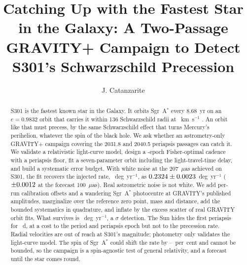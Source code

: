 \documentclass{aastex701}
\begin{document}
\title{Catching Up with the Fastest Star in the Galaxy: A Two-Passage GRAVITY+ Campaign to Detect S301's Schwarzschild Precession}

\author{J. Catanzarite}


\begin{abstract}
S301 is the fastest known star in the Galaxy. It orbits Sgr~A$^*$ every 8.68~yr on an $e = 0.9832$ orbit that carries it within 136 Schwarzschild radii at \lightcurveVpKms{}~km~s$^{-1}$ \citep{gravity2026}. An orbit like that must precess, by the same Schwarzschild effect that turns Mercury's perihelion, whatever the spin of the black hole. We ask whether an astrometry-only GRAVITY+ campaign covering the 2031.8 and 2040.5 periapsis passages can catch it. We validate a relativistic light-curve model, design a \campaignNEpochs{}-epoch Fisher-optimal cadence with a periapsis floor, fit a seven-parameter orbit including the light-travel-time delay, and build a systematic error budget. With white noise at the 207~$\mu$as achieved on S301, the fit recovers the injected rate, \fitTruthOmegaDotDegYr{}~deg~yr$^{-1}$, as $0.2324 \pm 0.0023$~deg~yr$^{-1}$ ($\pm0.0012$ at the forecast 100~$\mu$as). Real astrometric noise is not white. We add per-run calibration offsets and a wandering Sgr~A$^*$ photocentre at GRAVITY's published amplitudes, marginalize over the reference zero point, mass and distance, add the bounded systematics in quadrature, and inflate by the excess scatter of real GRAVITY orbit fits. What survives is \budgetBottomLineInflated{}~deg~yr$^{-1}$, a \budgetBottomLineInflatedDetectionNsigma{}$\sigma$ detection. The Sun hides the first periapsis for \conjunctionGapTotalDays{}~d, at a cost to the period and periapsis epoch but not to the precession rate. Radial velocities are out of reach at S301's magnitude; photometry only validates the light-curve model. The spin of Sgr~A$^*$ could shift the rate by \spinLtPctChiNineZero{}--\spinLtPctChiOneZeroZero{}~per~cent and cannot be bounded, so the campaign is a spin-agnostic test of general relativity, and a forecast until the star comes round.
\end{abstract}

\end{document}
